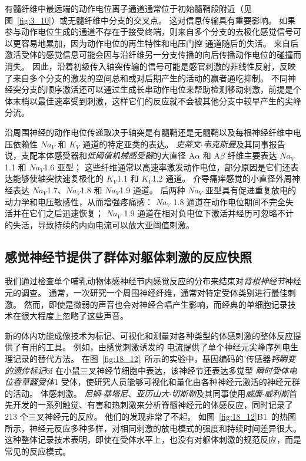 有髓纤维中最远端的动作电位离子通道通常位于初始髓鞘段附近（见图~\ref{fig:3_10}）或无髓纤维中分支的交叉点。
这对信息传输具有重要影响。
如果参与动作电位生成的通道不存在于接受终端，则来自多个分支的去极化感觉信号可以更容易地累加，因为动作电位的再生特性和电压门控  通道随后的失活。
来自后激活受体的感觉信息可能会因与沿纤维另一分支传播的向后传播动作电位的碰撞而消失。
因此，沿着初级传入轴突传输的信号可能是感官刺激的非线性反射，反映了来自多个分支的激发的空间总和或对后期产生的活动的赢者通吃抑制。
不同神经突分支的顺序激活还可以通过生成长串动作电位来帮助检测移动刺激，前提是个体末梢以最佳速率受到刺激，这样它们的反应就不会被其他分支中较早产生的尖峰分流。



沿周围神经的动作电位传递取决于轴突是有髓鞘还是无髓鞘以及每根神经纤维中电压依赖性 $Na_V$ 和 $K_V$ 通道的特定亚类的表达。
\textit{史蒂文$\cdot$韦克斯曼}及其同事报告说，支配本体感受器和\textit{低阈值机械感受器}的大直径 A$\alpha$ 和 A$\beta$ 纤维主要表达 $Na_V$1.1 和 $Na_V$1.6 亚型；
这些纤维通常以高速率激发动作电位，部分原因是它们还表达能够使轴突快速复极化的 $K_V$1.1 和 $K_V$1.2 通道。
介导痛痒感觉的小直径外周神经表达 $Na_V$1.7、$Na_V$1.8 和 $Na_V$1.9 通道。
后两种 $Na_V$ 亚型具有促进重复放电的动力学和电压敏感性，从而增强疼痛感：
$Na_V$ 1.8 通道在动作电位期间不完全失活并在它们之后迅速恢复； 
$Na_V$ 1.9 通道在相对负电位下激活并经历可忽略不计的失活，导致持续的内向电流可以放大亚阈值刺激。



\subsection{感觉神经节提供了群体对躯体刺激的反应快照}

我们通过检查单个哺乳动物体感神经节内感觉反应的分布来结束对\textit{背根神经节}神经元的调查。
通常，一次研究一个周围神经纤维，通常对特定受体类别进行最佳刺激。
然而，即使是微弱的声音也会对神经合唱产生影响，而经典的单细胞记录技术在很大程度上忽略了这些声音。


新的体内功能成像技术为标记、可视化和测量对各种类型的体感刺激的整体反应提供了有用的工具。
例如，由感觉刺激诱发的  电流提供了单个神经元尖峰序列电生理记录的替代方法。
在图~\ref{fig:18_12}~所示的实验中，基因编码的  传感器\textit{钙瞬变的遗传标记}6f 在小鼠三叉神经节细胞中表达，该神经节还表达多觉型 \textit{瞬时受体电位香草醛受体}1 受体，使研究人员能够可视化和量化由各种神经元激活的神经元群的活动。 体感刺激。
\textit{尼姆$\cdot$基塔尼}、\textit{亚历山大$\cdot$切斯勒}及其同事使用\textit{威廉$\cdot$威利斯}首先开发的一系列触觉、有害和热刺激来分析脊髓神经元的体感反应，同时记录了 213 个三叉神经元的反应。
他们的发现非常了不起。
如图~\ref{fig:18_12}B1~的热图所示，神经元反应多种多样，对相同刺激的放电模式的强度和持续时间差异很大。 
这种整体记录技术表明，即使在受体水平上，也没有对躯体刺激的规范反应，而是常见的反应模式。

